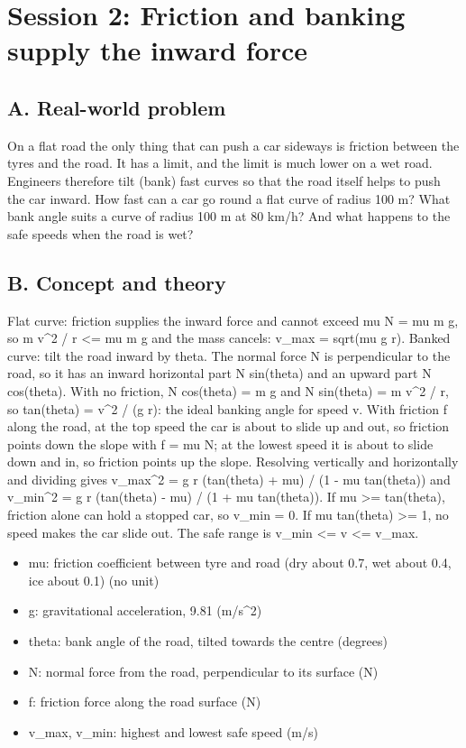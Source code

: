 \documentclass[11pt,a4paper]{article}
\begin{document}
\section{Session 2: Friction and banking supply the inward force}

\subsection*{A. Real-world problem}
On a flat road the only thing that can push a car sideways is friction between the tyres and the road. It has a limit, and the limit is much lower on a wet road. Engineers therefore tilt (bank) fast curves so that the road itself helps to push the car inward. How fast can a car go round a flat curve of radius 100 m? What bank angle suits a curve of radius 100 m at 80 km/h? And what happens to the safe speeds when the road is wet?

\subsection*{B. Concept and theory}
Flat curve: friction supplies the inward force and cannot exceed mu N = mu m g, so m v\textasciicircum{}2 / r \textless{}= mu m g and the mass cancels: v\_max = sqrt(mu g r). Banked curve: tilt the road inward by theta. The normal force N is perpendicular to the road, so it has an inward horizontal part N sin(theta) and an upward part N cos(theta). With no friction, N cos(theta) = m g and N sin(theta) = m v\textasciicircum{}2 / r, so tan(theta) = v\textasciicircum{}2 / (g r): the ideal banking angle for speed v. With friction f along the road, at the top speed the car is about to slide up and out, so friction points down the slope with f = mu N; at the lowest speed it is about to slide down and in, so friction points up the slope. Resolving vertically and horizontally and dividing gives v\_max\textasciicircum{}2 = g r (tan(theta) + mu) / (1 - mu tan(theta)) and v\_min\textasciicircum{}2 = g r (tan(theta) - mu) / (1 + mu tan(theta)). If mu \textgreater{}= tan(theta), friction alone can hold a stopped car, so v\_min = 0. If mu tan(theta) \textgreater{}= 1, no speed makes the car slide out. The safe range is v\_min \textless{}= v \textless{}= v\_max.

\begin{itemize}[nosep]
\item mu: friction coefficient between tyre and road (dry about 0.7, wet about 0.4, ice about 0.1) (no unit)
\item g: gravitational acceleration, 9.81 (m/s\textasciicircum{}2)
\item theta: bank angle of the road, tilted towards the centre (degrees)
\item N: normal force from the road, perpendicular to its surface (N)
\item f: friction force along the road surface (N)
\item v\_max, v\_min: highest and lowest safe speed (m/s)
\end{itemize}
\end{document}
